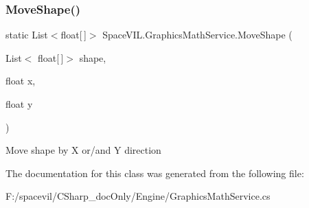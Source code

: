 \subsubsection{\texorpdfstring{Move\+Shape()}{MoveShape()}}
{\footnotesize\ttfamily static List$<$float\mbox{[}$\,$\mbox{]}$>$ Space\+V\+I\+L.\+Graphics\+Math\+Service.\+Move\+Shape (\begin{DoxyParamCaption}\item[{List$<$ float\mbox{[}$\,$\mbox{]}$>$}]{shape,  }\item[{float}]{x,  }\item[{float}]{y }\end{DoxyParamCaption})\hspace{0.3cm}{\ttfamily [static]}}



Move shape by X or/and Y direction 



The documentation for this class was generated from the following file\+:\begin{DoxyCompactItemize}
\item 
F\+:/spacevil/\+C\+Sharp\+\_\+doc\+Only/\+Engine/Graphics\+Math\+Service.\+cs\end{DoxyCompactItemize}
